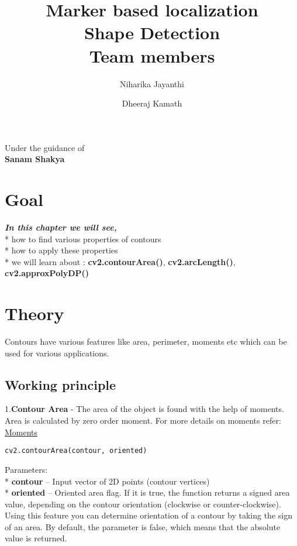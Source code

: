 \documentclass[]{article}
\date{}
\title {Marker based localization \\ [10pt]
	Shape Detection  \\[25pt] Team members }
\author {Niharika Jayanthi \and Dheeraj Kamath}
\begin{document}
\maketitle
\begin{center}
	\begin{large}
		Under the guidance of\\
		\textbf{Sanam Shakya}\\
		\vspace{0.5in}
	\end{large}
\end{center}
\section{Goal}\label{goal}

\emph{\textbf{In this chapter we will see,}} \\
* how to find various
properties of contours\\
* how to apply these properties\\
* we will learn
about : \textbf{cv2.contourArea()}, \textbf{cv2.arcLength()},
\textbf{cv2.approxPolyDP()}

\section{Theory}\label{theory}

Contours have various features like area, perimeter, moments etc which
can be used for various applications.

\subsection{Working principle}\label{working-principle}

1.\textbf{Contour Area} - The area of the object is found with the help
of moments. Area is calculated by zero order moment. For more details on
moments refer:
\href{https://github.com/eyantrainternship/eYSIP_2015_Marker_based_Robot_Localisation/wiki/Moments}{Moments}

\texttt{cv2.contourArea(contour,\ oriented)}

Parameters:\\
* \textbf{contour} -- Input vector of 2D points (contour vertices)\\
* \textbf{oriented} -- Oriented area flag. If it is true, the function
returns a signed area value, depending on the contour orientation
(clockwise or counter-clockwise). Using this feature you can determine
orientation of a contour by taking the sign of an area. By default, the
parameter is false, which means that the absolute value is returned.
\end{document}
